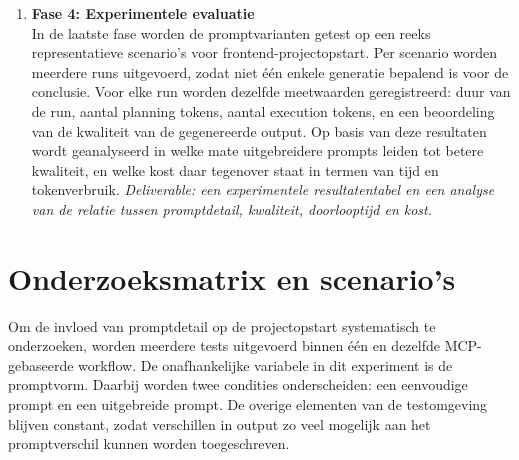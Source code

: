 \begin{enumerate}
Concreet worden twee prompttypes gedefinieerd:
\begin{itemize}
    \item \textbf{Eenvoudige prompt:} een korte, beperkte instructie waarin enkel de kern van de opdracht wordt meegegeven.
    \item \textbf{Uitgebreide prompt:} een meer gedetailleerde instructie waarin bijkomende context, verwachtingen, structuur of richtlijnen expliciet worden opgenomen.
\end{itemize}

De prompts worden toegepast op meerdere scenario's met oplopende omvang en complexiteit. De MCP-server, de gebruikte hostomgeving en de beschikbare context blijven constant, zodat de vergelijking zich effectief toespitst op de promptformulering.
\textit{Deliverable: een werkende MCP-server en een set experimentele promptvarianten die in een gecontroleerde testopstelling kunnen worden uitgevoerd.}

\item \textbf{Fase 4: Experimentele evaluatie} \\
In de laatste fase worden de promptvarianten getest op een reeks representatieve scenario's voor frontend-projectopstart. Per scenario worden meerdere runs uitgevoerd, zodat niet één enkele generatie bepalend is voor de conclusie. Voor elke run worden dezelfde meetwaarden geregistreerd: duur van de run, aantal planning tokens, aantal execution tokens, en een beoordeling van de kwaliteit van de gegenereerde output. Op basis van deze resultaten wordt geanalyseerd in welke mate uitgebreidere prompts leiden tot betere kwaliteit, en welke kost daar tegenover staat in termen van tijd en tokenverbruik.
\textit{Deliverable: een experimentele resultatentabel en een analyse van de relatie tussen promptdetail, kwaliteit, doorlooptijd en kost.}
\end{enumerate}

\section{Onderzoeksmatrix en scenario's}
\label{sec:testmatrix}

Om de invloed van promptdetail op de projectopstart systematisch te onderzoeken, worden meerdere tests uitgevoerd binnen één en dezelfde MCP-gebaseerde workflow. De onafhankelijke variabele in dit experiment is de promptvorm. Daarbij worden twee condities onderscheiden: een eenvoudige prompt en een uitgebreide prompt. De overige elementen van de testomgeving blijven constant, zodat verschillen in output zo veel mogelijk aan het promptverschil kunnen worden toegeschreven.

